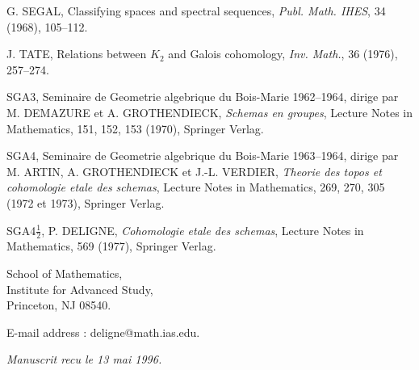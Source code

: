 \documentclass[11pt,a4paper]{article}
\theoremstyle{plain}
\theoremstyle{definition}
\begin{document}
\begin{enumerate}[label={[\arabic*]}, leftmargin=*, itemsep=0.5em]
\item G. SEGAL, Classifying spaces and spectral sequences, \textit{Publ. Math. IHES}, 34 (1968), 105--112.

\item J. TATE, Relations between $K_2$ and Galois cohomology, \textit{Inv. Math.}, 36 (1976), 257--274.

\item SGA3, Seminaire de Geometrie algebrique du Bois-Marie 1962--1964, dirige par M. DEMAZURE et A. GROTHENDIECK, \textit{Schemas en groupes}, Lecture Notes in Mathematics, 151, 152, 153 (1970), Springer Verlag.

\item SGA4, Seminaire de Geometrie algebrique du Bois-Marie 1963--1964, dirige par M. ARTIN, A. GROTHENDIECK et J.-L. VERDIER, \textit{Theorie des topos et cohomologie etale des schemas}, Lecture Notes in Mathematics, 269, 270, 305 (1972 et 1973), Springer Verlag.

\item SGA4$\frac{1}{2}$, P. DELIGNE, \textit{Cohomologie etale des schemas}, Lecture Notes in Mathematics, 569 (1977), Springer Verlag.
\end{enumerate}

\vspace{2em}
\noindent School of Mathematics,\\
Institute for Advanced Study,\\
Princeton, NJ 08540.

\vspace{0.5em}
\noindent E-mail address : deligne@math.ias.edu.

\vspace{1em}
\noindent \textit{Manuscrit recu le 13 mai 1996.}
\end{document}
